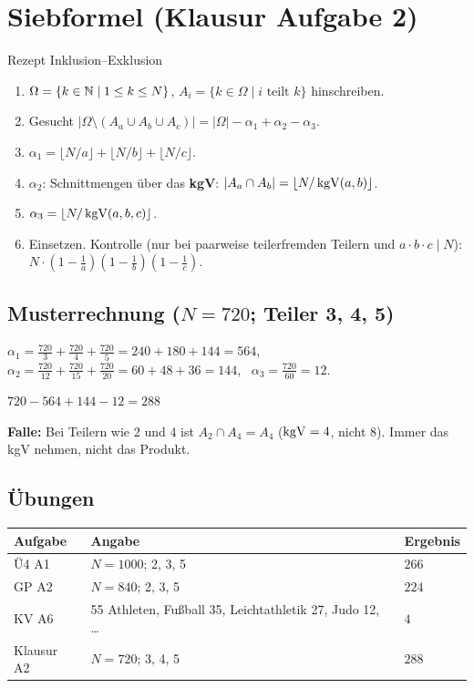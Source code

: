 \section{Siebformel (Klausur Aufgabe 2)}
\begin{rezept}{Rezept Inklusion--Exklusion}
\begin{enumerate}
\item $\Omega = \{k \in \mathbb{N} \mid 1 \le k \le N\}$, $A_i = \{k \in \Omega \mid i \text{ teilt } k\}$ hinschreiben.
\item Gesucht $|\Omega \setminus (A_a \cup A_b \cup A_c)| = |\Omega| - \alpha_1 + \alpha_2 - \alpha_3$.
\item $\alpha_1 = \lfloor N/a \rfloor + \lfloor N/b \rfloor + \lfloor N/c \rfloor$.
\item $\alpha_2$: Schnittmengen über das \textbf{kgV}: $|A_a \cap A_b| = \lfloor N / \operatorname{kgV}(a,b) \rfloor$.
\item $\alpha_3 = \lfloor N / \operatorname{kgV}(a, b, c) \rfloor$.
\item Einsetzen. Kontrolle (nur bei paarweise teilerfremden Teilern und $a \cdot b \cdot c \mid N$): $N \cdot (1 - \frac1a)(1 - \frac1b)(1 - \frac1c)$.
\end{enumerate}
\end{rezept}

\subsection*{Musterrechnung ($N = 720$; Teiler 3, 4, 5)}
$\alpha_1 = \frac{720}{3} + \frac{720}{4} + \frac{720}{5} = 240 + 180 + 144 = 564$, \ $\alpha_2 = \frac{720}{12} + \frac{720}{15} + \frac{720}{20} = 60 + 48 + 36 = 144$, \ $\alpha_3 = \frac{720}{60} = 12$.
\begin{ergebnis} $720 - 564 + 144 - 12 = 288$ \end{ergebnis}
\begin{achtung}
\textbf{Falle:} Bei Teilern wie 2 und 4 ist $A_2 \cap A_4 = A_4$ ($\operatorname{kgV} = 4$, nicht $8$). Immer das kgV nehmen, nicht das Produkt.
\end{achtung}

\subsection*{Übungen}
\begin{tabular}{@{}lll@{}}
\toprule
Aufgabe & Angabe & Ergebnis\\
\midrule
Ü4 A1 & $N = 1000$; 2, 3, 5 & $266$\\
GP A2 & $N = 840$; 2, 3, 5 & $224$\\
KV A6 & 55 Athleten, Fußball 35, Leichtathletik 27, Judo 12, \dots & $4$\\
Klausur A2 & $N = 720$; 3, 4, 5 & $288$\\
\bottomrule
\end{tabular}

